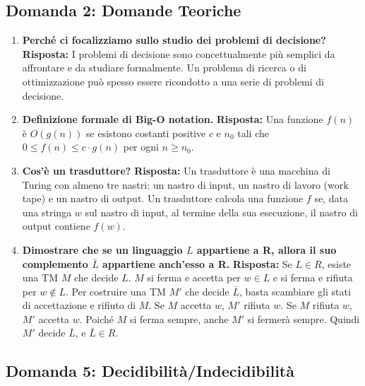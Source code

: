 \documentclass[a4paper]{article}
\begin{document}
\subsection{Domanda 2: Domande Teoriche}
\begin{enumerate}[label=\Alph*]
    \item \textbf{Perché ci focalizziamo sullo studio dei problemi di decisione?}
    \textbf{Risposta:} I problemi di decisione sono concettualmente più semplici da affrontare e da studiare formalmente. Un problema di ricerca o di ottimizzazione può spesso essere ricondotto a una serie di problemi di decisione.

    \item \textbf{Definizione formale di Big-O notation.}
    \textbf{Risposta:} Una funzione $f(n)$ è $O(g(n))$ se esistono costanti positive $c$ e $n_0$ tali che $0 \le f(n) \le c \cdot g(n)$ per ogni $n \ge n_0$.

    \item \textbf{Cos'è un trasduttore?}
    \textbf{Risposta:} Un trasduttore è una macchina di Turing con almeno tre nastri: un nastro di input, un nastro di lavoro (work tape) e un nastro di output. Un trasduttore calcola una funzione $f$ se, data una stringa $w$ sul nastro di input, al termine della sua esecuzione, il nastro di output contiene $f(w)$.

    \item \textbf{Dimostrare che se un linguaggio $L$ appartiene a R, allora il suo complemento $\bar{L}$ appartiene anch'esso a R.}
    \textbf{Risposta:} Se $L \in R$, esiste una TM $M$ che decide $L$. $M$ si ferma e accetta per $w \in L$ e si ferma e rifiuta per $w \notin L$. Per costruire una TM $M'$ che decide $\bar{L}$, basta scambiare gli stati di accettazione e rifiuto di $M$. Se $M$ accetta $w$, $M'$ rifiuta $w$. Se $M$ rifiuta $w$, $M'$ accetta $w$. Poiché $M$ si ferma sempre, anche $M'$ si fermerà sempre. Quindi $M'$ decide $\bar{L}$, e $\bar{L} \in R$.
\end{enumerate}

\subsection{Domanda 5: Decidibilità/Indecidibilità}
\end{document}
